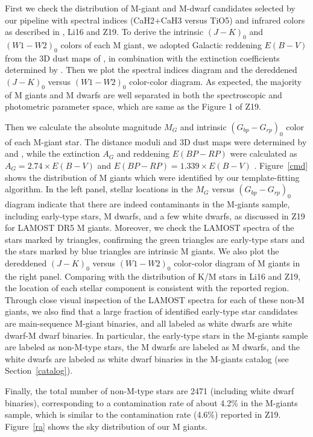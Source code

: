 \documentclass[manuscript]{aastex62}
\begin{document}
\begin{CJK*}{UTF8}{gbsn}
First we check the distribution of M-giant and M-dwarf candidates selected by our pipeline with spectral indices (CaH2+CaH3 versus TiO5) and infrared colors as described in \citet{2015RAA....15.1154Z}, Li16 and Z19. To derive the intrinsic $(J-K)_0$ and $(W1-W2)_0$ colors of each M giant, we adopted Galactic reddening $E(B-V)$ from the 3D dust maps of \citet{2019ApJ...887...93G}, in combination with the extinction coefficients determined by \citet{2013MNRAS.430.2188Y}. Then we plot the spectral indices diagram and the dereddened $(J-K)_0$ versus $(W1-W2)_0$ color-color diagram. As expected, the majority of M giants and M dwarfs are well separated in both the spectroscopic and photometric parameter space, which are same as the Figure 1 of Z19.

Then we calculate the absolute magnitude $M_G$ and intrinsic $(G_{bp}-G_{rp})_0$ color of each M-giant star. The distance moduli and 3D dust maps were determined by \citet{2021AJ....161...147B} and \citet{2019ApJ...887...93G}, while the extinction $A_G$ and reddening $E(BP-RP)$ were calculated as $A_G=2.74 \times E(B-V)$ and $E(BP-RP)=1.339 \times E(B-V)$ \citep{2018MNRAS.479L.102C}. Figure~\ref{cmd} shows the distribution of M giants which were identified by our template-fitting algorithm. In the left panel, stellar locations in the $M_G$ versus  $(G_{bp}-G_{rp})_0$ diagram  \citep{2021A&A...650C...3G} indicate that there are indeed contaminants in the M-giants sample, including early-type stars, M dwarfs, and a few white dwarfs, as discussed in Z19 for LAMOST DR5 M giants. Moreover, we check the LAMOST spectra of the stars marked by triangles, confirming the green triangles are early-type stars and the stars marked by blue triangles are intrinsic M giants. We also plot the dereddened $(J-K)_0$ versus $(W1-W2)_0$ color-color diagram of M giants in the right panel. Comparing with the distribution of K/M stars in Li16 and Z19, the location of each stellar component is consistent with the reported region. Through close visual inspection of the LAMOST spectra for each of these non-M giants, we also find that a large fraction of identified early-type star candidates are main-sequence M-giant binaries, and all labeled as white dwarfs are white dwarf-M dwarf binaries. In particular, the early-type stars in the M-giants sample are labeled as non-M-type stars, the M dwarfs are labeled as M dwarfs, and the white dwarfs are labeled as white dwarf binaries in the M-giants catalog (see Section~\ref{catalog}).

Finally, the total number of non-M-type stars are 2471 (including white dwarf binaries), corresponding to a contamination rate of about 4.2$\%$ in the M-giants sample, which is similar to the contamination rate (4.6$\%$) reported in Z19. Figure~\ref{ra} shows the sky distribution of our M giants.


\end{CJK*}
\end{document}
